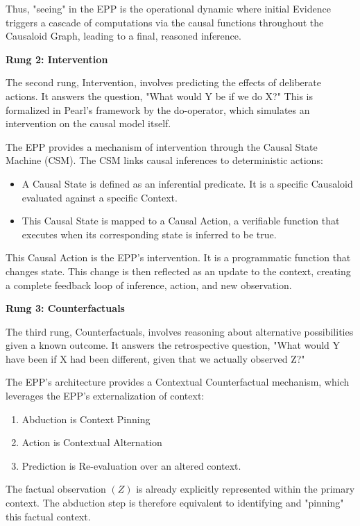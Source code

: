 Thus, "seeing" in the EPP is the operational dynamic where initial Evidence triggers a cascade of computations via the causal functions throughout the Causaloid Graph, leading to a final, reasoned inference.

\textbf{Rung 2: Intervention}

The second rung, Intervention, involves predicting the effects of deliberate actions. It answers the question, "What would Y be if we do X?" This is formalized in Pearl's framework by the do-operator, which simulates an intervention on the causal model itself.

The EPP provides a mechanism of intervention through the Causal State Machine (CSM). 
The CSM  links causal inferences to deterministic actions:

\begin{itemize}
	\item A Causal State is defined as an inferential predicate. It is a specific Causaloid evaluated against a specific Context.
	\item This Causal State is mapped to a Causal Action, a verifiable function that executes when its corresponding state is inferred to be true.

\end{itemize}

This Causal Action is the EPP's intervention. It is a programmatic function that changes state. 
This change is then reflected as an update to the context, creating a complete feedback loop of inference, action, and new observation.

\textbf{Rung 3: Counterfactuals}

The third rung, Counterfactuals, involves reasoning about alternative possibilities given a known outcome. It answers the retrospective question, "What would Y have been if X had been different, given that we actually observed Z?"

The EPP's architecture provides a Contextual Counterfactual mechanism, which leverages the EPP's externalization of context:

\begin{enumerate}
	\item Abduction is Context Pinning
	\item Action is Contextual Alternation
	\item Prediction is Re-evaluation over an altered context. 
\end{enumerate}

The factual observation $(Z)$ is already explicitly represented within the primary context. 
The abduction step is therefore equivalent to identifying and "pinning" this factual context.

